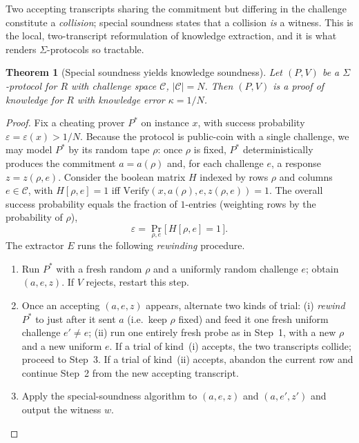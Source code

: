 \documentclass[11pt,a4paper]{article}
\newtheorem{theorem}{Theorem}[section]
\theoremstyle{definition}
\theoremstyle{remark}
\begin{document}
Two accepting transcripts sharing the commitment but differing in the challenge constitute a \emph{collision}; special soundness states that a collision \emph{is} a witness. This is the local, two-transcript reformulation of knowledge extraction, and it is what renders \(\Sigma\)-protocols so tractable.

\begin{theorem}[Special soundness yields knowledge soundness]\label{zk:thm:special}
Let \((P,V)\) be a \(\Sigma\)-protocol for \(R\) with challenge space \(\mathcal{C}\), \(|\mathcal{C}| = N\). Then \((P,V)\) is a proof of knowledge for \(R\) with knowledge error \(\kappa = 1/N\).
\end{theorem}

\begin{proof}
Fix a cheating prover \(P^*\) on instance \(x\), with success probability \(\varepsilon = \varepsilon(x) > 1/N\). Because the protocol is public-coin with a single challenge, we may model \(P^*\) by its random tape \(\rho\): once \(\rho\) is fixed, \(P^*\) deterministically produces the commitment \(a = a(\rho)\) and, for each challenge \(e\), a response \(z = z(\rho, e)\). Consider the boolean matrix \(H\) indexed by rows \(\rho\) and columns \(e \in \mathcal{C}\), with \(H[\rho, e] = 1\) iff \(\mathrm{Verify}(x, a(\rho), e, z(\rho,e)) = 1\). The overall success probability equals the fraction of \(1\)-entries (weighting rows by the probability of \(\rho\)),
\[
  \varepsilon = \Pr_{\rho, e}\big[\, H[\rho,e]=1 \,\big].
\]
The extractor \(E\) runs the following \emph{rewinding} procedure.
\begin{enumerate}
  \item Run \(P^*\) with a fresh random \(\rho\) and a uniformly random challenge \(e\); obtain \((a, e, z)\). If \(V\) rejects, restart this step.
  \item Once an accepting \((a, e, z)\) appears, alternate two kinds of trial: (i) \emph{rewind} \(P^*\) to just after it sent \(a\) (i.e.\ keep \(\rho\) fixed) and feed it one fresh uniform challenge \(e' \ne e\); (ii) run one entirely fresh probe as in Step~1, with a new \(\rho\) and a new uniform \(e\). If a trial of kind~(i) accepts, the two transcripts collide; proceed to Step~3. If a trial of kind~(ii) accepts, abandon the current row and continue Step~2 from the new accepting transcript.
  \item Apply the special-soundness algorithm to \((a,e,z)\) and \((a,e',z')\) and output the witness \(w\).
\end{enumerate}

\end{proof}
\end{document}
